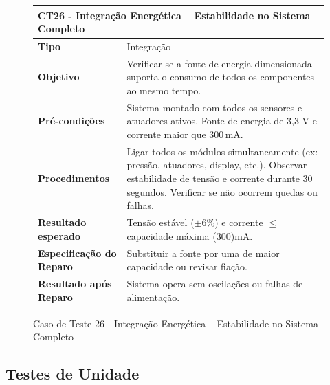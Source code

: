\begin{figure}[H]
    \centering
\begin{longtable}{|p{}|p{}|}
\hline
\multicolumn{2}{|l|}{\textbf{CT26 - Integração Energética – Estabilidade no Sistema Completo}} \\
\hline
\textbf{Tipo} & Integração \\
\hline
\textbf{Objetivo} & Verificar se a fonte de energia dimensionada suporta o consumo de todos os componentes ao mesmo tempo. \\
\hline
\textbf{Pré-condições} & Sistema montado com todos os sensores e atuadores ativos.  Fonte de energia de 3,3 V e corrente maior que 300\,mA. \\
\hline
\textbf{Procedimentos} & Ligar todos os módulos simultaneamente (ex: pressão, atuadores, display, etc.).  Observar estabilidade de tensão e corrente durante 30 segundos.  Verificar se não ocorrem quedas ou falhas. \\
\hline
\textbf{Resultado esperado} & Tensão estável ($\pm 6\%$) e corrente $\le$ capacidade máxima ($300$)mA. \\
\hline
\textbf{Especificação do Reparo} & Substituir a fonte por uma de maior capacidade ou revisar fiação. \\
\hline
\textbf{Resultado após Reparo} & Sistema opera sem oscilações ou falhas de alimentação. \\
\hline
\end{longtable}
\caption{Caso de Teste 26 - Integração Energética – Estabilidade no Sistema Completo}
\label{fig_ct26_integracao_energetica_estabilidade_sistema_completo}
\end{figure}

\subsection*{Testes de Unidade}

